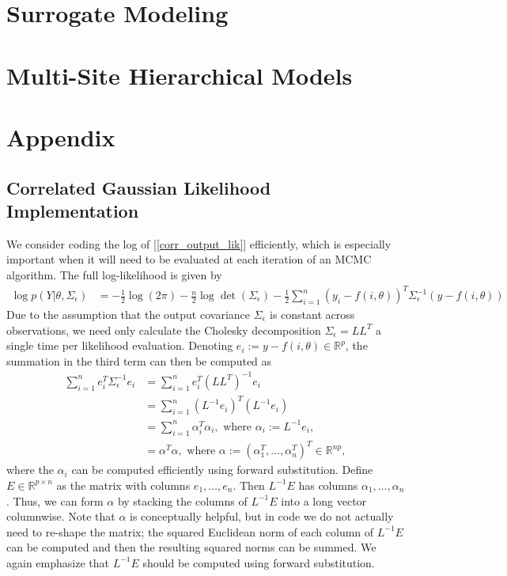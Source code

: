 \documentclass[12pt]{article}
\newcommand{\R}{\mathbb{R}}
\begin{document}
\section{Surrogate Modeling}
\section{Multi-Site Hierarchical Models}

\section{Appendix}

\subsection{Correlated Gaussian Likelihood Implementation} \label{corr_output_lik_implementation}
We consider coding the log of [\ref{corr_output_lik}] efficiently, which is especially important when it will need to be evaluated at each iteration of an
MCMC algorithm. The full log-likelihood is given by 
\begin{align}
\log p(Y|\theta, \Sigma_\epsilon) &= -\frac{1}{2} \log(2\pi) -\frac{n}{2} \log \det(\Sigma_\epsilon) - \frac{1}{2} \sum_{i = 1}^{n} (y_i - f(i, \theta))^T \Sigma_\epsilon^{-1} (y - f(i, \theta)) \label{log_lik_corr_outputs}
\end{align}
Due to the assumption that the output covariance $\Sigma_\epsilon$ is constant across observations, we need only calculate the Cholesky decomposition 
$\Sigma_\epsilon = LL^T$ a single time per likelihood evaluation. Denoting $e_i := y - f(i, \theta) \in \R^p$, the summation in the third term can then be computed as
\begin{align}
\sum_{i = 1}^{n} e_i^T \Sigma_\epsilon^{-1} e_i &= \sum_{i = 1}^{n} e_i^T (L L^T)^{-1} e_i \\
									&= \sum_{i = 1}^{n} (L^{-1} e_i)^T (L^{-1} e_i) \nonumber \\
									&=  \sum_{i = 1}^{n} \alpha_i^T \alpha_i, \text{ where } \alpha_i := L^{-1}e_i, \nonumber \\
									&= \alpha^T \alpha, \text{ where } \alpha := (\alpha_1^T, \dots, \alpha_n^T)^T \in \R^{np}, \nonumber
\end{align}
where the $\alpha_i$ can be computed efficiently using forward substitution. Define $E \in \R^{p \times n}$ as the matrix with columns $e_1, \dots, e_n$. 
Then $L^{-1}E$ has columns $\alpha_1, \dots, \alpha_n$. Thus, we can form $\alpha$ by stacking the columns of $L^{-1}E$ into a long vector 
columnwise. Note that $\alpha$ is conceptually helpful, but in code we do not actually need to re-shape the matrix; the squared Euclidean norm of each column 
of $L^{-1}E$ can be computed and then the resulting squared norms can be summed. We again emphasize that $L^{-1}E$ should be computed using forward 
substitution. 
\end{document}
